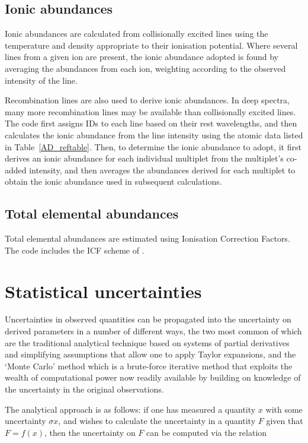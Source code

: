 \documentclass[useAMS,usenatbib]{mn2e}
\begin{document}
\subsection{Ionic abundances}

Ionic abundances are calculated from collisionally excited lines using the temperature and density appropriate to their ionisation potential.  Where several lines from a given ion are present, the ionic abundance adopted is found by averaging the abundances from each ion, weighting according to the observed intensity of the line.

Recombination lines are also used to derive ionic abundances.  In deep spectra, many more recombination lines may be available than collisionally excited lines.  The code first assigns IDs to each line based on their rest wavelengths, and then calculates the ionic abundance from the line intensity using the atomic data listed in Table~\ref{AD_reftable}.  Then, to determine the ionic abundance to adopt, it first derives an ionic abundance for each individual multiplet from the multiplet's co-added intensity, and then averages the abundances derived for each multiplet to obtain the ionic abundance used in subsequent calculations.

\subsection{Total elemental abundances}

Total elemental abundances are estimated using Ionisation Correction Factors.  The code includes the ICF scheme of \citet{1994MNRAS.271..257K}.

\section{Statistical uncertainties}

Uncertainties in observed quantities can be propagated into the uncertainty on derived parameters in a number of different ways, the two most common of which are the traditional analytical technique based on systems of partial derivatives and simplifying assumptions that allow one to apply Taylor expansions, and the `Monte Carlo' method which is a brute-force iterative method that exploits the wealth of computational power now readily available by building on knowledge of the uncertainty in the original observations.

The analytical approach is as follows: if one has measured a quantity $x$ with some uncertainty $\sigma x$, and wishes to calculate the uncertainty in a quantity $F$ given that $F = f(x)$, then the uncertainty on $F$ can be computed via the relation 
\end{document}
